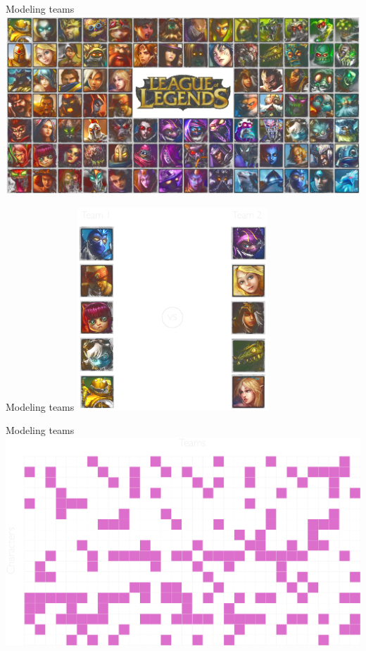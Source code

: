 \documentclass[mathserif]{beamer}
\begin{document}
\begin{frame}{Modeling teams}
\includegraphics[width=\textwidth]{figures/champions_transparent.png}\\
\end{frame}


\begin{frame}{Modeling teams}
\centering
\includegraphics[height=3in]{figures/champions5v5.pdf}
\end{frame}


\begin{frame}{Modeling teams}
\centering
\includegraphics[width=\textwidth]{figures/grid_hots.pdf}
\end{frame}
\end{document}
